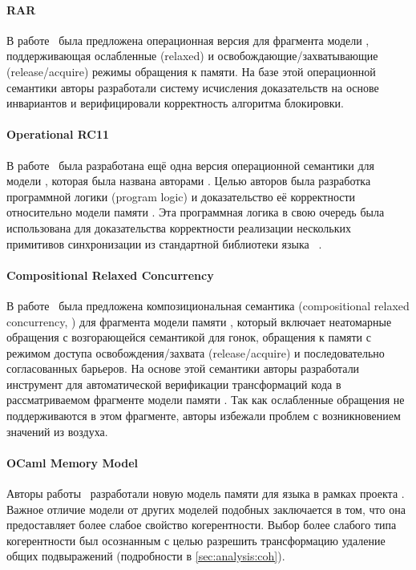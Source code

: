 \paragraph{RAR}

В работе~\cite{Doherty-al:PPoPP19} была предложена 
операционная версия для фрагмента модели \RCMM,
поддерживающая ослабленные (relaxed) и
освобождающие/захватывающие (release/acquire)
режимы обращения к памяти. 
На базе этой операционной семантики 
авторы разработали систему исчисления доказательств 
на основе инвариантов и верифицировали корректность
алгоритма блокировки. 

\paragraph{Operational RC11}

В работе~\cite{Dang-al:POPL19} была разработана 
ещё одна версия операционной семантики для модели \RCMM, 
которая была названа авторами \ORCMM.
Целью авторов была разработка программной логики 
(program logic) и доказательство её корректности 
относительно модели памяти \ORCMM.
Эта программная логика в свою очередь была использована
для доказательства корректности реализации нескольких 
примитивов синхронизации из стандартной библиотеки
языка \Rust~\cite{RustBook:19}.

\paragraph{Compositional Relaxed Concurrency}

В работе~\cite{Dodds-al:ESOP18} была предложена 
композициональная семантика (compositional relaxed concurrency, \CRC) 
для фрагмента модели памяти \CMM, 
который включает неатомарные обращения с возгорающейся семантикой для гонок, 
обращения к памяти с режимом доступа освобождения/захвата (release/acquire)
и последовательно согласованных барьеров. 
На основе этой семантики авторы разработали инструмент для 
автоматической верификации трансформаций кода
в рассматриваемом фрагменте модели памяти \CMM.
Так как ослабленные обращения не поддерживаются в этом фрагменте, 
авторы избежали проблем с возникновением значений из воздуха. 

\paragraph{OCaml Memory Model}

Авторы работы~\cite{Dolan-al:PLDI18} разработали новую модель памяти \OCMM
для языка \OCaml в рамках проекта \MOCaml.
Важное отличие модели \OCMM от других моделей подобных \CMM 
заключается в том, что она предоставляет более слабое свойство когерентности. 
Выбор более слабого типа когерентности был осознанным с целью 
разрешить трансформацию удаление общих подвыражений 
(\see подробности в \cref{sec:analysis:coh}).

